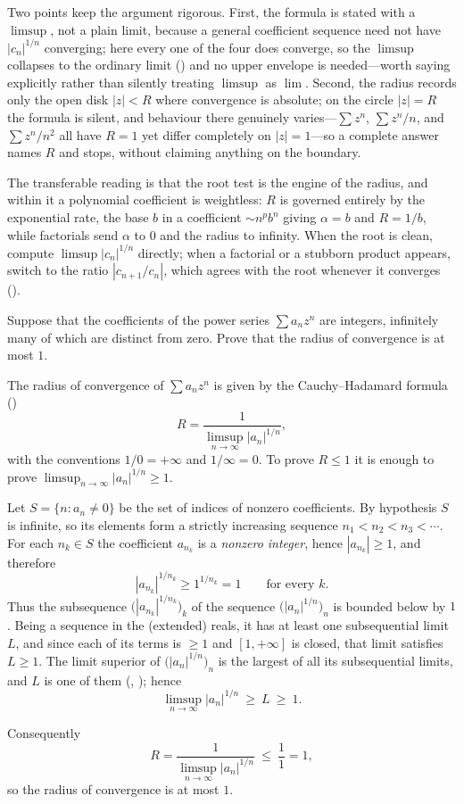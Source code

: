 \documentclass[main.tex]{subfiles}
\begin{document}
\begin{Reflection}
Two points keep the argument rigorous. First, the formula is stated with a $\limsup$, not a plain
limit, because a general coefficient sequence need not have $|c_n|^{1/n}$ converging; here every one of
the four does converge, so the $\limsup$ collapses to the ordinary limit () and no upper
envelope is needed---worth saying explicitly rather than silently treating $\limsup$ as $\lim$. Second,
the radius records only the open disk $|z|<R$ where convergence is absolute; on the circle $|z|=R$ the
formula is silent, and behaviour there genuinely varies---$\sum z^n$, $\sum z^n/n$, and $\sum z^n/n^2$
all have $R=1$ yet differ completely on $|z|=1$---so a complete answer names $R$ and stops, without
claiming anything on the boundary.

The transferable reading is that the root test is the engine of the radius, and within it a
polynomial coefficient is weightless: $R$ is governed entirely by the exponential rate, the base $b$ in
a coefficient $\sim n^{p}b^{n}$ giving $\alpha=b$ and $R=1/b$, while factorials send $\alpha$ to $0$ and
the radius to infinity. When the root is clean, compute $\limsup|c_n|^{1/n}$ directly; when a factorial
or a stubborn product appears, switch to the ratio $|c_{n+1}/c_n|$, which agrees with the root whenever
it converges ().
\end{Reflection}

Suppose that the coefficients of the power series $\sum a_{n} z^{n}$ are integers, infinitely many of
which are distinct from zero. Prove that the radius of convergence is at most $1$.

\begin{SolutionBlue}
The radius of convergence of $\sum a_n z^n$ is given by the Cauchy--Hadamard formula
()
\[
R=\frac{1}{\limsup_{n\to\infty}|a_n|^{1/n}},
\]
with the conventions $1/0=+\infty$ and $1/\infty=0$. To prove $R\le 1$ it is enough to prove
$\limsup_{n\to\infty}|a_n|^{1/n}\ge 1$.

Let $S=\{n:a_n\neq 0\}$ be the set of indices of nonzero coefficients. By hypothesis $S$ is infinite,
so its elements form a strictly increasing sequence $n_1<n_2<n_3<\cdots$. For each $n_k\in S$ the
coefficient $a_{n_k}$ is a \emph{nonzero integer}, hence $|a_{n_k}|\ge 1$, and therefore
\[
|a_{n_k}|^{1/n_k}\ge 1^{1/n_k}=1\qquad\text{for every }k.
\]
Thus the subsequence $\bigl(|a_{n_k}|^{1/n_k}\bigr)_k$ of the sequence $\bigl(|a_n|^{1/n}\bigr)_n$ is
bounded below by $1$. Being a sequence in the (extended) reals, it has at least one subsequential
limit $L$, and since each of its terms is $\ge 1$ and $[1,+\infty]$ is closed, that limit satisfies
$L\ge 1$. The limit superior of $\bigl(|a_n|^{1/n}\bigr)_n$ is the largest of all its subsequential
limits, and $L$ is one of them (, ); hence
\[
\limsup_{n\to\infty}|a_n|^{1/n}\ \ge\ L\ \ge\ 1.
\]

Consequently
\[
R=\frac{1}{\limsup_{n\to\infty}|a_n|^{1/n}}\ \le\ \frac{1}{1}=1,
\]
so the radius of convergence is at most $1$.
\end{SolutionBlue}
\end{document}
